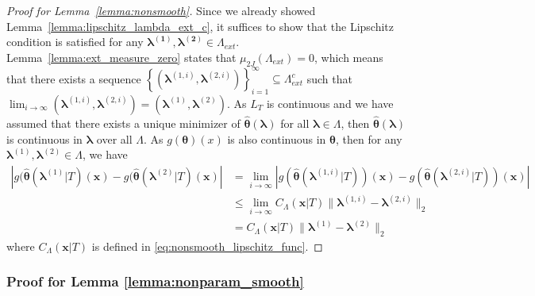 \documentclass[10pt]{book}
\theoremstyle{definition}
\begin{document}
\begin{proof}[Proof for Lemma~\ref{lemma:nonsmooth}]
	Since we already showed Lemma~\ref{lemma:lipschitz_lambda_ext_c}, it suffices to show that the Lipschitz condition is satisfied for any $\boldsymbol{\lambda^{(1)}},\boldsymbol{\lambda^{(2)}}\in\Lambda_{ext}$.
	Lemma~\ref{lemma:ext_measure_zero} states that $\mu_{2J}(\Lambda_{ext}) = 0$, which means that there exists a sequence
	$\left \{\left(\boldsymbol{\lambda}^{(1,i)},\boldsymbol{\lambda}^{(2,i)}\right) \right \}_{i=1}^\infty \subseteq \Lambda_{ext}^{c}$
	such that $\lim_{i\rightarrow\infty}\left(\boldsymbol{\lambda}^{(1,i)},\boldsymbol{\lambda}^{(2,i)}\right)=\left(\boldsymbol{\lambda}^{(1)},\boldsymbol{\lambda}^{(2)}\right)$.
	As $L_T$ is continuous and we have assumed that there exists a unique minimizer of $\hat{\boldsymbol{\theta}}(\boldsymbol{\lambda})$ for all $\boldsymbol{\lambda} \in \Lambda$, then $\hat{\boldsymbol{\theta}}(\boldsymbol{\lambda})$ is continuous in $\boldsymbol{\lambda}$ over all $\Lambda$.
	As $g(\boldsymbol{\theta})(x)$ is also continuous in $\boldsymbol{\theta}$, then for any $\boldsymbol{\lambda}^{(1)},\boldsymbol{\lambda}^{(2)}\in\Lambda$,
	we have
	\begin{align}
		\left |
		g(\hat{\boldsymbol{\theta}}(\boldsymbol{\lambda}^{(1)} | T)(\boldsymbol{x})
		-
		g(\hat{\boldsymbol{\theta}}(\boldsymbol{\lambda}^{(2)} | T)(\boldsymbol{x})
		\right |
		& = \lim_{i\rightarrow\infty}
		\left |
		g(\hat{\boldsymbol{\theta}}(\boldsymbol{\lambda}^{(1,i)} |T))(\boldsymbol{x})
		-
		g(\hat{\boldsymbol{\theta}}(\boldsymbol{\lambda}^{(2,i)} |T))(\boldsymbol{x})
		\right |\\
		& \le \lim_{i\rightarrow\infty}
		C_\Lambda(\boldsymbol{x}|T)
		\|\boldsymbol{\lambda}^{(1,i)}-\boldsymbol{\lambda}^{(2,i)}\|_{2}\\
		& = C_\Lambda(\boldsymbol{x}|T)
		\|\boldsymbol{\lambda}^{(1)}-\boldsymbol{\lambda}^{(2)}\|_{2}
	\end{align}
	where $C_\Lambda(\boldsymbol{x}|T)$ is defined in \eqref{eq:nonsmooth_lipschitz_func}.
\end{proof}

\subsubsection{Proof for Lemma \ref{lemma:nonparam_smooth}}
\end{document}

